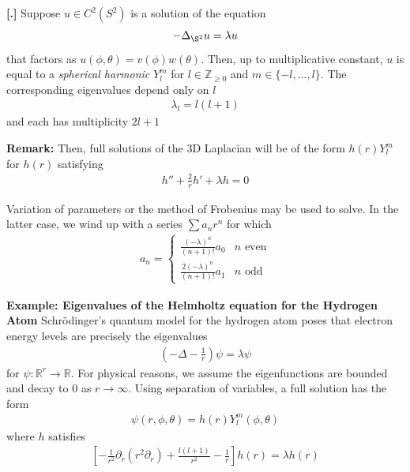 \documentclass{article}
\newcommand{\R}{{\mathbb{R}}}
\newcommand{\Z}{{\mathbb{Z}}}
\newcommand{\pd}{\partial}
\newcounter{result}[section]
\newenvironment{res}[1][]{\refstepcounter{result}\par\medskip
	\noindent \textbf{[\thesection.\theresult] #1} \rmfamily}{\medskip}
\begin{document}
	\begin{res}
		Suppose $u \in C^{2}(S^{2})$ is a solution of the equation 
		\begin{align*}
			-\Delta_{\S^{2}}u = \lambda u
		\end{align*}
		that factors as $u(\phi,\theta) = v(\phi)w(\theta)$. Then, up to multiplicative constant, $u$ is equal to a \textit{spherical harmonic} $Y^{m}_{l}$ for $l \in \Z_{\geq 0}$ and $m \in \{-l,...,l\}$. The corresponding eigenvalues depend only on $l$
		\begin{align*}
			\lambda_{l} = l(l+1)
		\end{align*}
		and each has multiplicity $2l+1$
	\end{res}
	
	\textbf{Remark:} Then, full solutions of the 3D Laplacian will be of the form $h(r)Y^{m}_{l}$ for $h(r)$ satisfying 
	\begin{align*}
		h'' + \frac{2}{r} h' + \lambda h=0
	\end{align*}
	
	Variation of parameters or the method of Frobenius may be used to solve. In the latter case, we wind up with a series $\sum a_{n}r^{n}$ for which 
	\begin{align*}
		a_{n} = \begin{cases}
			\frac{(-\lambda)^{n}}{(n+1)!}a_{0} & n \text{ even}\\
			\frac{2(-\lambda)^{n}}{(n+1)!}a_{1} & n \text{ odd}
		\end{cases}
	\end{align*}
	
	\vspace{0.25 cm}
	\textbf{Example: Eigenvalues of the Helmholtz equation for the Hydrogen Atom} Schr{\"o}dinger's quantum model for the hydrogen atom poses that electron energy levels are precisely the eigenvalues 
	\begin{align*}
		(-\Delta  - \frac{1}{r}) \psi = \lambda \psi
	\end{align*}
	for $\psi: \R^{r} \to \R$. For physical reasons, we assume the eigenfunctions are bounded and decay to $0$ as $r \to \infty$. Using separation of variables, a full solution has the form 
	\begin{align*}
		\psi(r,\phi,\theta) = h(r) Y^{m}_{l}(\phi,\theta)
	\end{align*}
	where $h$ satisfies
	\begin{align*}
		\left[-\frac{1}{r^{2}} \pd_{r} (r^{2} \pd_{r}) + \frac{l(l+1)}{r^{2}} - \frac{1}{r} \right]h(r) = \lambda h(r)
	\end{align*}
	
\end{document}
